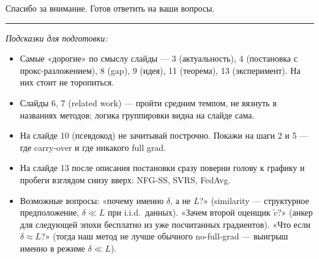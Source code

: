 \documentclass[11pt,a4paper]{article}
\begin{document}
Спасибо за внимание. Готов ответить на ваши вопросы.

\vspace{1.2cm}
{\color{accent}\rule{\linewidth}{0.4mm}}

\vspace{0.4cm}
\textit{Подсказки для подготовки:}

\begin{itemize}
\item Самые «дорогие» по смыслу слайды — 3 (актуальность), 4 (постановка с прокс-разложением), 8 (gap), 9 (идея), 11 (теорема), 13 (эксперимент). На них стоит не торопиться.
\item Слайды 6, 7 (related work) — пройти средним темпом, не вязнуть в названиях методов; логика группировки видна на слайде сама.
\item На слайде 10 (псевдокод) не зачитывай построчно. Покажи на шаги 2 и 5 — где carry-over и где никакого full grad.
\item На слайде 13 после описания постановки сразу поверни голову к графику и пробеги взглядом снизу вверх: NFG-SS, SVRS, FedAvg.
\item Возможные вопросы: «почему именно $\delta$, а не $L$?» (similarity — структурное предположение, $\delta \ll L$ при i.i.d.~данных). «Зачем второй оценщик $\tilde v$?» (анкер для следующей эпохи бесплатно из уже посчитанных градиентов). «Что если $\delta \approx L$?» (тогда наш метод не лучше обычного no-full-grad — выигрыш именно в режиме $\delta \ll L$).
\end{itemize}
\end{document}

